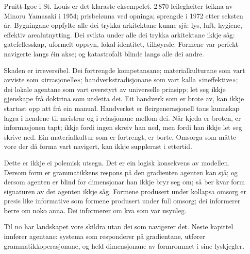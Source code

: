 Pruitt-Igoe i St. Louis er det klaraste eksempelet. 2\,870 leilegheiter teikna av Minoru Yamasaki i 1954; prisbelønna ved opninga; sprengde i 1972 etter seksten år. Bygningane oppfylte alle dei trykka arkitektane kunne sjå: lys, luft, hygiene, effektiv arealutnytting. Dei svikta under alle dei trykka arkitektane ikkje såg: gatefellesskap, uformelt oppsyn, lokal identitet, tilhøyrsle. Formene var perfekt navigerte langs éin akse; og katastrofalt blinde langs alle dei andre.

Skaden er irreversibel. Dei fortrengde kompetansane; materialkulturane som vart avviste som «irrasjonelle»; handverkstradisjonane som vart kalla «ineffektive»; dei lokale agentane som vart overstyrt av universelle prinsipp; let seg ikkje gjenskape frå doktrina som utsletta dei. Eit handverk som er brote av, kan ikkje startast opp att frå ein manual. Handverket er fleirgenerasjonell taus kunnskap lagra i hendene til meistrar og i relasjonane mellom dei. Når kjeda er broten, er informasjonen tapt; ikkje fordi ingen skreiv han ned, men fordi han ikkje let seg skrive ned. Ein materialkultur som er fortrengt, er borte. Omsorga som måtte vore der då forma vart navigert, kan ikkje supplerast i ettertid.

Dette er ikkje ei polemisk utsegn. Det er ein logisk konsekvens av modellen. Dersom form er grammatikkens respons på den gradienten agenten kan sjå; og dersom agenten er blind for dimensjonar han ikkje bryr seg om; så ber kvar form signaturen av det agenten ikkje såg. Formene produsert under kollapsa omsorg er presis like informative som formene produsert under full omsorg; dei informerer berre om noko anna. Dei informerer om kva som var usynleg.

\begin{overgang}
Til no har landskapet vore skildra utan dei som navigerer det. Neste kapittel innfører agentane: systema som responderer på gradientane, utfører grammatikkoperasjonane, og held dimensjonane av formrommet i sine lyskjegler.
\end{overgang}
